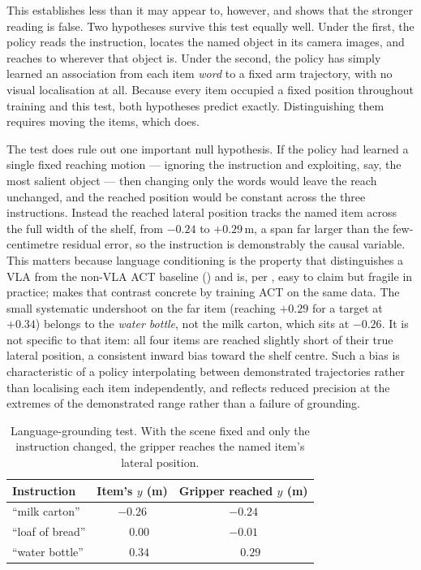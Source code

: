 This establishes less than it may appear to, however, and
 shows that the stronger reading is false. Two hypotheses
survive this test equally well. Under the first, the policy reads the instruction,
locates the named object in its camera images, and reaches to wherever that object
is. Under the second, the policy has simply learned an association from each item
\emph{word} to a fixed arm trajectory, with no visual localisation at all. Because
every item occupied a fixed position throughout training and this test, both
hypotheses predict  exactly. Distinguishing them requires
moving the items, which  does.

The test does rule out one important null hypothesis. If the policy had learned a
single fixed reaching motion --- ignoring the instruction and exploiting, say, the most
salient object --- then changing only the words would leave the reach unchanged, and the
reached position would be constant across the three instructions. Instead the reached
lateral position tracks the named item across the full width of the shelf, from
$-0.24$ to $+0.29$\,\si{m}, a span far larger than the few-centimetre residual error,
so the instruction is demonstrably the causal variable. This matters because language
conditioning is the property that distinguishes a VLA from the non-VLA ACT baseline
() and is, per \textcite{kiviranta2025smolvla}, easy to claim but
fragile in practice;  makes that contrast concrete by training
ACT on the same data. The small systematic undershoot on the far item (reaching $+0.29$ for a
target at $+0.34$) belongs to the \emph{water bottle}, not the milk carton, which sits
at $-0.26$. It is not specific to that item: all four items are reached slightly short
of their true lateral position, a consistent inward bias toward the shelf centre. Such
a bias is characteristic of a policy interpolating between demonstrated trajectories
rather than localising each item independently, and reflects reduced precision at the
extremes of the demonstrated range rather than a failure of grounding.

\begin{table}[ht]
\caption{Language-grounding test. With the scene fixed and only the instruction
changed, the gripper reaches the named item's lateral position.}
\begin{center}
\begin{tabular}{lcc}
\toprule
Instruction & Item's $y$ (m) & Gripper reached $y$ (m) \\
\midrule
``milk carton''  & $-0.26$ & $-0.24$ \\
``loaf of bread'' & $\phantom{-}0.00$ & $-0.01$ \\
``water bottle'' & $\phantom{-}0.34$ & $\phantom{-}0.29$ \\
\bottomrule
\end{tabular}
\end{center}
\label{tab:grounding}
\end{table}

